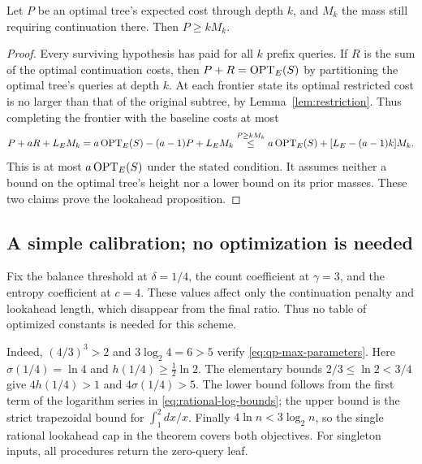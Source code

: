 \begin{claim}
\label{clm:lookahead-expected-payment}
Let $P$ be an optimal tree's expected cost through depth $k$, and
$M_k$ the mass still requiring continuation there. Then $P\ge kM_k$.
\end{claim}
\begin{proof}
Every surviving hypothesis has paid for all $k$ prefix queries.
If $R$ is the sum of the optimal continuation costs, then
$P+R=\operatorname{OPT}_E(S)$ by partitioning the optimal tree's queries at depth
$k$. At each frontier state its optimal restricted cost is no larger
than that of the original subtree, by Lemma~\ref{lem:restriction}.
Thus completing the frontier with the baseline costs
at most
\[
 P+aR+L_EM_k
 =a\operatorname{OPT}_E(S)-(a-1)P+L_EM_k
 \overset{P\ge kM_k}{\le}
 a\operatorname{OPT}_E(S)+[L_E-(a-1)k]M_k.
\]
This is at most $a\operatorname{OPT}_E(S)$ under the stated condition. It assumes
neither a bound on the optimal tree's height nor a lower bound on
its prior masses. These two claims prove the lookahead proposition.
\end{proof}

\subsection{A simple calibration; no optimization is needed}

\begin{parameterchoice}
Fix the balance threshold at $\delta=1/4$, the count coefficient at
$\gamma=3$, and the entropy coefficient at $c=4$. These values
affect only the continuation penalty and lookahead length, which
disappear from the final ratio. Thus no table of optimized constants
is needed for this scheme.
\end{parameterchoice}

Indeed, $(4/3)^3>2$ and $3\log_2 4=6>5$ verify
\eqref{eq:qp-max-parameters}. Here $\sigma(1/4)=\ln4$ and
$h(1/4)\ge\tfrac12\ln2$. The elementary bounds
$2/3\le\ln2<3/4$ give $4h(1/4)>1$ and
$4\sigma(1/4)>5$. The lower bound follows from the first term of
the logarithm series in \eqref{eq:rational-log-bounds}; the upper
bound is the strict trapezoidal bound for $\int_1^2 dx/x$.
Finally $4\ln n<3\log_2 n$, so the single rational lookahead
cap in the theorem covers both objectives. For singleton inputs,
all procedures return the zero-query leaf.

